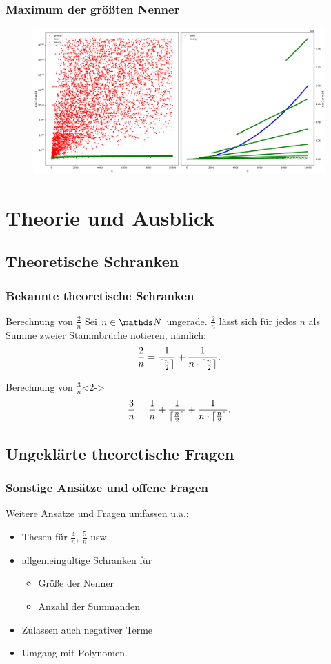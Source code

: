 \documentclass{beamer}
\begin{document}
\begin{frame}
\frametitle{Maximum der größten Nenner}
\begin{figure}[h]
	\includegraphics[width=\textwidth]{../LaTeX-Doc/images/maxDenom2in1.png}
\end{figure}
\end{frame}

\section{Theorie und Ausblick}
\subsection{Theoretische Schranken}

\begin{frame}
	\frametitle{Bekannte theoretische Schranken}
	\begin{block}{Berechnung von $\frac{2}{n}$}
	Sei $n \in \N$ ungerade. $\frac{2}{n}$ lässt sich für jedes $n$ als Summe zweier Stammbrüche notieren, nämlich:
	$$\frac{2}{n} = \frac{1}{\lceil \frac{n}{2} \rceil} + \frac{1}{n \cdot \lceil \frac{n}{2} \rceil}.$$
	\end{block}
	\begin{block}{Berechnung von $\frac{3}{n}$}<2->
		$$\frac{3}{n} = \frac{1}{n} + \frac{1}{\lceil \frac{n}{2} \rceil} + \frac{1}{n \cdot \lceil \frac{n}{2} \rceil}.$$
	\end{block}
\end{frame}

\subsection{Ungeklärte theoretische Fragen}

\begin{frame}
	\frametitle{Sonstige Ansätze und offene Fragen}
	Weitere Ansätze und Fragen umfassen u.a.:
	\begin{itemize}
		\item Thesen für $\frac{4}{n}$, $\frac{5}{n}$ usw.
		\item allgemeingültige Schranken für
		\begin{itemize}
			\item Größe der Nenner
			\item Anzahl der Summanden
		\end{itemize}
		\item Zulassen auch negativer Terme
		\item Umgang mit Polynomen.
	\end{itemize}
\end{frame}
\end{document}
